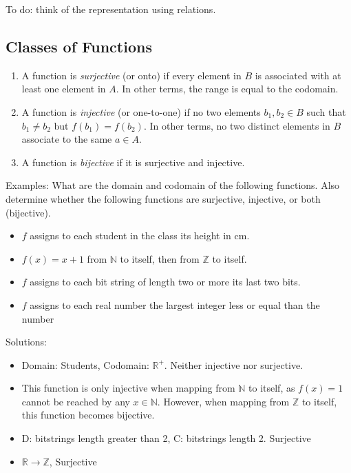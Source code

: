 \documentclass{article}
\begin{document}
    To do: think of the representation using relations.
    
    
\subsection*{Classes of Functions}
    \begin{enumerate}
        \item A function is \textit{surjective} (or onto) if every element in $B$ is associated with at least one element in $A$. In other terms, the range is equal to the codomain. \\
        \item A function is \textit{injective} (or one-to-one) if no two elements $b_1, b_2 \in B$ such that $b_1 \neq b_2$ but $f(b_1) = f(b_2)$. In other terms, no two distinct elements in $B$ associate to the same $a \in A$. \\
        \item A function is \textit{bijective} if it is surjective and injective.
    \end{enumerate}
    
    Examples:
    What are the domain and codomain of the following functions. Also determine whether the following functions are surjective, injective, or both (bijective).
    \begin{itemize}
        \item $f$ assigns to each student in the class its height in cm.
        \item $f(x) = x+1$ from $\mathbb{N}$ to itself, then from $\mathbb{Z}$ to itself.
        \item $f$ assigns to each bit string of length two or more its last two bits.
        \item $f$ assigns to each real number the largest integer less or equal than the number
    \end{itemize}
    
    Solutions:
    \begin{itemize}
        \item Domain: Students, Codomain: $\mathbb{R}^{+}$. Neither injective nor surjective.
        \item This function is only injective when mapping from $\mathbb{N}$ to itself, as $f(x) = 1$ cannot be reached by any $x \in \mathbb{N}$. However, when mapping from $\mathbb{Z}$ to itself, this function becomes bijective.
        \item D: bitstrings length greater than 2, C: bitstrings length 2. Surjective
        \item $\mathbb{R} \rightarrow \mathbb{Z}$, Surjective
    \end{itemize}
    
\end{document}
